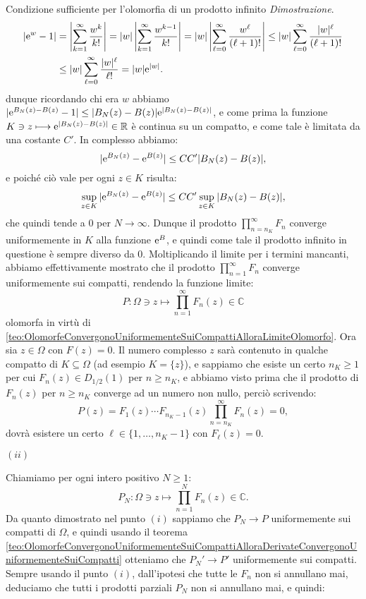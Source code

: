 \documentclass[11pt]{book}
\makeatletter
\theoremstyle{Definizione}
\theoremstyle{TeoremaProposizioneLemmaCorollarioCongettura}
\theoremstyle{OsservazioneNotaEsempio}
\renewenvironment{proof}[1][\proofname]{\par
  \normalfont \topsep6\p@\@plus6\p@\relax
  \trivlist
  \item[\hskip\labelsep
        \itshape
    #1\@addpunct{.}]\ignorespaces
}{%
  \endtrivlist\@endpefalse
}
\renewenvironment{proof}{\textsl{Dimostrazione}.}{}
\newcommand{\R}{\mathbb{R}}
\newcommand{\C}{\mathbb{C}}
\newcommand{\Disc}[3][]{D^{#1}_{{#2}}({#3})}
\newcommand{\e}{\textup{e}}
\makeatother
\begin{document}
\begin{boxteo}{Condizione sufficiente per l'olomorfia di un prodotto infinito}
\begin{proof}
\begin{align*}
|\e^{w}-1| &= \left|\sum_{k = 1}^\infty \frac{w^k}{k!}\right| = |w| \left|\sum_{k = 1}^\infty \frac{w^{k-1}}{k!}\right| = |w| \left|\sum_{\ell = 0}^\infty \frac{w^{\ell}}{(\ell+1)!}\right| \leq |w| \sum_{\ell = 0}^\infty \frac{|w|^\ell}{(\ell+1)!}\\
&\leq |w|\sum_{\ell = 0}^\infty \frac{|w|^\ell}{\ell!} = |w|\e^{|w|}.
\end{align*}
dunque ricordando chi era $w$ abbiamo $|\e^{B_N(z)-B(z)}-1| \leq |B_N(z)-B(z)|\e^{|B_N(z)-B(z)|}$, e come prima la funzione $K \ni z \longmapsto \e^{|B_N(z)-B(z)|}\in \R$ è continua su un compatto, e come tale è limitata da una costante $C'$. In complesso abbiamo:
$$
|\e^{B_N(z)}-\e^{B(z)}| \leq CC'|B_N(z)-B(z)|,
$$
e poiché ciò vale per ogni $z\in K$ risulta:
$$
\sup_{z\in K} |\e^{B_N(z)}-\e^{B(z)}| \leq CC'\sup_{z\in K}|B_N(z)-B(z)|,
$$
che quindi tende a $0$ per $N \to \infty$. Dunque il prodotto $\prod_{n = n_K}^\infty F_n$ converge uniformemente in $K$ alla funzione $\e^{B}$, e quindi come tale il prodotto infinito in questione è sempre diverso da $0$. Moltiplicando il limite per i termini mancanti, abbiamo effettivamente mostrato che il prodotto $\prod_{n = 1}^\infty F_n$ converge uniformemente sui compatti, rendendo la funzione limite:
$$
P:\Omega \ni z \longmapsto \prod_{n = 1}^\infty F_n(z)\in \C
$$
olomorfa in virtù di \ref{teo:OlomorfeConvergonoUniformementeSuiCompattiAlloraLimiteOlomorfo}. Ora sia $z\in \Omega$ con $F(z) = 0$. Il numero complesso $z$ sarà contenuto in qualche compatto di $K\subseteq \Omega$ (ad esempio $K = \{z\}$), e sappiamo che esiste un certo $n_K \geq 1$ per cui $F_n(z) \in \Disc{1/2}{1}$ per $n\geq n_K$, e abbiamo visto prima che il prodotto di $F_n(z)$ per $n\geq n_K$ converge ad un numero non nullo, perciò scrivendo:
$$
P(z) = F_1(z)\cdots F_{n_K-1}(z)\prod_{n = n_K}^\infty F_n(z) = 0,
$$
dovrà esistere un certo $\ell\in \{1,\dots,n_{K}-1\}$ con $F_\ell(z) = 0$.
\begin{flushleft}
$(ii)$
\end{flushleft}
Chiamiamo per ogni intero positivo $N\geq 1$:
$$
P_N:\Omega\ni z \longmapsto \prod_{n = 1}^N F_n(z)\in \C.
$$
Da quanto dimostrato nel punto $(i)$ sappiamo che $P_N\to P$ uniformemente sui compatti di $\Omega$, e quindi usando il teorema \ref{teo:OlomorfeConvergonoUniformementeSuiCompattiAlloraDerivateConvergonoUniformementeSuiCompatti} otteniamo che $P_N' \to P'$ uniformemente sui compatti. Sempre usando il punto $(i)$, dall'ipotesi che tutte le $F_n$ non si annullano mai, deduciamo che tutti i prodotti parziali $P_N$ non si annullano mai, e quindi:

\end{proof}
\end{boxteo}
\end{document}
